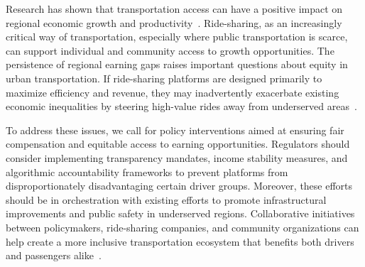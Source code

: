 Research has shown that transportation access can have a positive impact on regional economic growth and productivity~\cite{targa2005economic, banerjee2020road, alstadt2012relationship}. Ride-sharing, as an increasingly critical way of transportation, especially where public transportation is scarce, can support individual and community access to growth opportunities. The persistence of regional earning gaps raises important questions about equity in urban transportation. If ride-sharing platforms are designed primarily to maximize efficiency and revenue, they may inadvertently exacerbate existing economic inequalities by steering high-value rides away from underserved areas~\cite{durand2022access, bocarejo2012transport}.

To address these issues, we call for policy interventions aimed at ensuring fair compensation and equitable access to earning opportunities. Regulators should consider implementing transparency mandates, income stability measures, and algorithmic accountability frameworks to prevent platforms from disproportionately disadvantaging certain driver groups. Moreover, these efforts should be in orchestration with existing efforts to promote infrastructural improvements and public safety in underserved regions. Collaborative initiatives between policymakers, ride-sharing companies, and community organizations can help create a more inclusive transportation ecosystem that benefits both drivers and passengers alike~\cite{baber2022new}.
